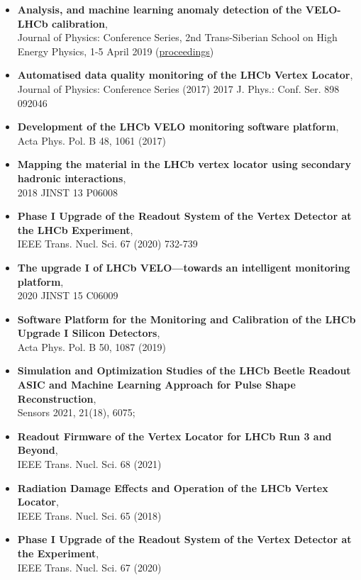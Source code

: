\begin{itemize}

  \item \textbf{Analysis, and machine learning anomaly detection of the VELO-LHCb calibration},
        \\ Journal of Physics: Conference Series, 2nd Trans-Siberian School on High Energy Physics, 1-5 April 2019 (\href{https://doi.org/10.1088/1742-6596/1337/1/012006}{proceedings})

  \item \textbf{Automatised data quality monitoring of the LHCb Vertex Locator},
        \\ Journal of Physics: Conference Series (2017) 2017 J. Phys.: Conf. Ser. 898 092046

  \item \textbf{Development of the LHCb VELO monitoring software platform},
        \\ Acta Phys. Pol. B 48, 1061 (2017)

  \item \textbf{Mapping the material in the LHCb vertex locator using secondary hadronic interactions},
        \\ 2018 JINST 13 P06008

  \item \textbf{Phase I Upgrade of the Readout System of the Vertex Detector at the LHCb Experiment},
        \\ IEEE Trans. Nucl. Sci. 67 (2020) 732-739

  \item \textbf{The upgrade I of LHCb VELO—towards an intelligent monitoring platform},
        \\ 2020 JINST 15 C06009

  \item \textbf{Software Platform for the Monitoring and Calibration of the LHCb Upgrade I Silicon Detectors},
        \\ Acta Phys. Pol. B 50, 1087 (2019)

  \item \textbf{Simulation and Optimization Studies of the LHCb Beetle Readout ASIC and Machine Learning Approach for Pulse Shape Reconstruction},
        \\ Sensors 2021, 21(18), 6075;
  \item \textbf{Readout Firmware of the Vertex Locator for LHCb Run 3 and Beyond},
        \\ IEEE Trans. Nucl. Sci. 68 (2021)
  \item \textbf{Radiation Damage Effects and Operation of the LHCb Vertex Locator},
        \\ IEEE Trans. Nucl. Sci. 65 (2018)
  \item \textbf{Phase I Upgrade of the Readout System of the Vertex Detector at the Experiment},
        \\ IEEE Trans. Nucl. Sci. 67 (2020)
\end{itemize}

